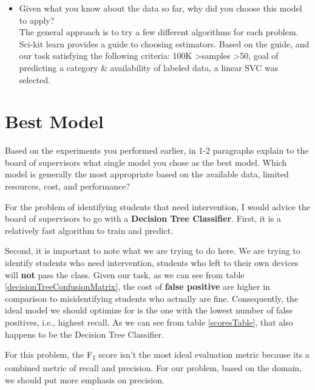 \documentclass[12pt]{article}
\begin{document}
\begin{itemize}
\item Given what you know about the data so far, why did you choose this model to apply?\\
The general approach is to try a few different algorithms for each problem. Sci-kit learn provides a guide to choosing estimators. Based on the guide, and our task satisfying the following criteria: {100K \textgreater samples \textgreater 50, goal of predicting a category \& availability of labeled data}, a linear SVC was selected. 
\end{itemize}


\section*{Best Model}
Based on the experiments you performed earlier, in 1-2 paragraphs explain to the board of supervisors what single model you chose as the best model. Which model is generally the most appropriate based on the available data, limited resources, cost, and performance?

For the problem of identifying students that need intervention, I would advice the board of supervisors to go with a \textbf{Decision Tree Classifier}. First, it is a relatively fast algorithm to train and predict. 

Second, it is important to note what we are trying to do here. We are trying to identify students who need intervention, students who left to their own devices will \textbf{not} pass the class. Given our task, as we can see from table \ref{decisionTreeConfusionMatrix}, the cost of \textbf{false positive} are higher in comparison to misidentifying students who actually are fine. Consequently, the ideal model we should optimize for is the one with the lowest number of false positives, i.e., highest recall. As we can see from table \ref{scoresTable}, that also happens to be the Decision Tree Classifier. 

For this problem, the F\textsubscript{1} score isn't the most ideal evaluation metric because its a combined metric of recall and precision. For our problem, based on the domain, we should put more emphasis on precision.
\end{document}
